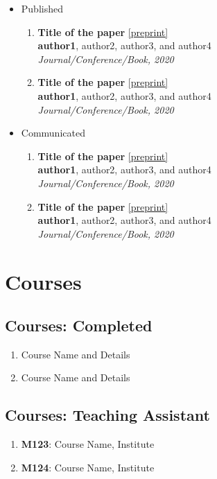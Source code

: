 \documentclass[letterpaper,11pt]{article}
\begin{document}
\begin{itemize}
    \item Published
    \begin{enumerate}
        \item \textbf{Title of the paper}          \href{google.com}{[preprint]}\\
        \textbf{author1}, author2, author3, and author4 \\
        \textit{Journal/Conference/Book, 2020}
        \item \textbf{Title of the paper}          \href{google.com}{[preprint]}\\
        \textbf{author1}, author2, author3, and author4 \\
        \textit{Journal/Conference/Book, 2020}
    \end{enumerate}
    \item Communicated
    \begin{enumerate}
        \item \textbf{Title of the paper}          \href{google.com}{[preprint]}\\
        \textbf{author1}, author2, author3, and author4 \\
        \textit{Journal/Conference/Book, 2020}
        \item \textbf{Title of the paper}          \href{google.com}{[preprint]}\\
        \textbf{author1}, author2, author3, and author4 \\
        \textit{Journal/Conference/Book, 2020}
    \end{enumerate}
\end{itemize}

\section{Courses}
\subsection{Courses: Completed}
\begin{enumerate}
    \item Course Name and Details
    \item Course Name and Details
\end{enumerate} 

\subsection{Courses: Teaching Assistant}
\begin{enumerate}
    \item \textbf{M123}: Course Name, Institute
    \item \textbf{M124}: Course Name, Institute
\end{enumerate}
\end{document}
